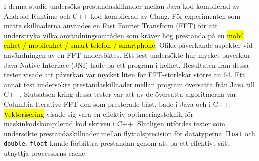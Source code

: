 I denna studie undersöks prestandaskillnader mellan Java-kod kompilerad av Android Runtime och C++-kod kompilerad av Clang. För experimenten som mätte skillnaderna användes en Fast Fourier Transform (FFT) för att understryka vilka användningsområden som kräver hög prestanda på en \hl{mobil enhet / mobilenhet / smart telefon / smartphone}. Olika påverkande aspekter vid användningen av en FFT undersöktes. Ett test undersökte hur mycket påverkan Java Native Interface (JNI) hade på ett program i helhet. Resultaten från dessa tester visade att påverkan var mycket liten för FFT-storlekar större än 64. Ett annat test undersökte prestandaskillnader mellan program översatta från Java till C++. Slutsatsen kring dessa tester var att av de översatta algoritmerna var Columbia Iterative FFT den som presterade bäst, både i Java och i C++. \hl{Vektorisering} visade sig vara en effektiv optimeringsteknik för maskinkodskompilerad kod skriven i C++. Slutligen utfördes tester som undersökte prestandaskillnader mellan flyttalsprecision för datatyperna \texttt{float} och \texttt{double}. \texttt{float} kunde förbättra prestandan genom att på ett effektivt sätt utnyttja processorns cache.

